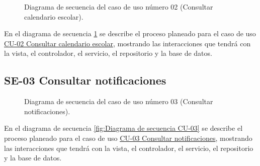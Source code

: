 \begin{figure}[htbp!]
	\begin{center}
		\caption{Diagrama de secuencia del caso de uso número 02 (Consultar calendario escolar).}
		\label{fig:Diagrama de secuencia CU-02}
	\end{center}
\end{figure}

En el diagrama de secuencia \ref{fig:Diagrama de secuencia CU-02} se describe el proceso planeado para el caso de uso \hyperlink{CU-02}{CU-02 Consultar calendario escolar}, mostrando las interacciones que tendrá con la vista, el controlador, el servicio, el repositorio y la base de datos.

\newpage

\subsection{SE-03 Consultar notificaciones}

\begin{figure}[htbp!]
	\begin{center}
		\caption{Diagrama de secuencia del caso de uso número 03 (Consultar notificaciones).}
		\label{fig:Diagrama se secuencia CU-03}
	\end{center}
\end{figure}

En el diagrama de secuencia \ref{fig:Diagrama de secuencia CU-03} se describe el proceso planeado para el caso de uso \hyperlink{CU-03}{CU-03 Consultar notificaciones}, mostrando las interacciones que tendrá con la vista, el controlador, el servicio, el repositorio y la base de datos.

